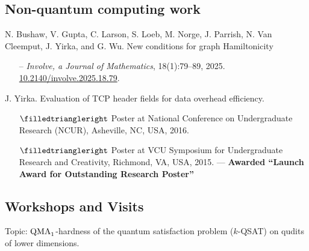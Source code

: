 \documentclass[11pt,letterpaper,serif]{moderncv}
\newcommand{\pubItemSep}{0em}
\begin{document}
\subsection{Non-quantum computing work}
N. Bushaw, V. Gupta, C. Larson, S. Loeb, M. Norge, J. Parrish, N. Van Cleemput, J. Yirka, and G. Wu.\quad
New conditions for graph Hamiltonicity
\begin{adjustwidth}{.25in}{}
	\begin{itemize}[itemsep=\pubItemSep]
		\item[--] \textit{Involve, a Journal of Mathematics}, 18(1):79--89, 2025.\quad
		\href{https://doi.org/10.2140/involve.2025.18.79}{10.2140/involve.2025.18.79}.
	\end{itemize}
\end{adjustwidth}
\medskip

J. Yirka.\quad
Evaluation of TCP header fields for data overhead efficiency.
\begin{adjustwidth}{.25in}{}
	\begin{itemize}[itemsep=\pubItemSep]
		\item[$\filledtriangleright$] Poster at National Conference on Undergraduate Research (NCUR), Asheville, NC, USA, 2016.
		\item[$\filledtriangleright$] Poster at VCU Symposium for Undergraduate Research and Creativity, Richmond, VA, USA, 2015. --- \textbf{Awarded ``Launch Award for Outstanding Research Poster''}
	\end{itemize}
\end{adjustwidth}

\smallskip
\subsection{Workshops and Visits}




{
	\begin{adjustwidth}{.25in}{}
		Topic: $\textup{QMA}_{1}$-hardness of the quantum satisfaction problem ($k$-QSAT) on qudits of lower dimensions.
	\end{adjustwidth}
}
\end{document}
